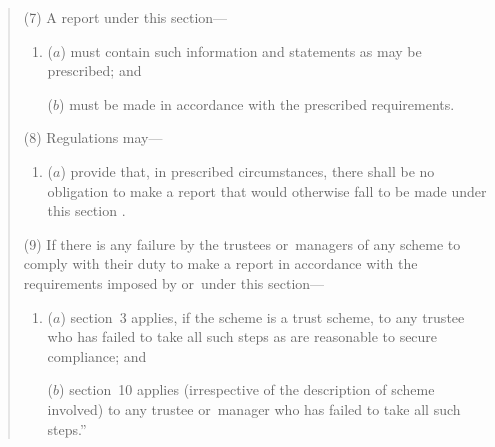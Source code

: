 \documentclass[12pt,a4paper]{article}
\begin{document}
\begin{quotation}
%
%

(7) A report under this section—
\begin{enumerate}\item[]
($a$) must contain such information and statements as may be prescribed; and

($b$) must be made in accordance with the prescribed requirements.
\end{enumerate}

(8) Regulations may—
\begin{enumerate}\item[]
($a$) provide that, in prescribed circumstances, there shall be no obligation to make a report that would otherwise fall to be made under this section%
%
%
.
\end{enumerate}

(9) If there is any failure by the trustees or~managers of any scheme to comply with their duty to make a report in accordance with the requirements imposed by or~under this section—
\begin{enumerate}\item[]
($a$) section~3 applies, if the scheme is a trust scheme, to any trustee who has failed to take all such steps as are reasonable to secure compliance; and

($b$) section~10 applies (irrespective of the description of scheme involved) to any trustee or~manager who has failed to take all such steps.”
\end{enumerate}
\end{quotation}
\end{document}
